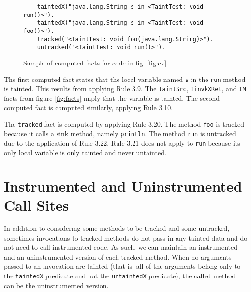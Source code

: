 \begin{figure}[H]
  \begin{lstlisting}
    taintedX("java.lang.String s in <TaintTest: void run()>").
    taintedX("java.lang.String s in <TaintTest: void foo()>").
    tracked("<TaintTest: void foo(java.lang.String)>").
    untracked("<TaintTest: void run()>").
  \end{lstlisting}
  \caption{Sample of computed facts for code in fig. \ref{fig:ex}}\label{fig:sol}
\end{figure}

The first computed fact states that the local variable named \texttt{s} in the \texttt{run} method is tainted. This results from applying Rule 3.9. The \texttt{taintSrc}, \texttt{IinvkXRet}, and \texttt{IM} facts from figure \ref{fig:facts} imply that the variable is tainted. The second computed fact is computed similarly, applying Rule 3.10.

The \texttt{tracked} fact is computed by applying Rule 3.20. The method \texttt{foo} is tracked because it calls a sink method, namely \texttt{println}. The method \texttt{run} is untracked due to the application of Rule 3.22. Rule 3.21 does not apply to \texttt{run} because its only local variable is only tainted and never untainted. 
    
\section{Instrumented and Uninstrumented Call Sites}
In addition to considering some methods to be tracked and some
untracked, sometimes invocations to tracked methods do not pass in any
tainted data and do not need to call instrumented code. As such, we
can maintain an instrumented and an uninstrumented version of each
tracked method. When no arguments passed to an invocation are tainted
(that is, all of the arguments belong only to the \texttt{taintedX}
predicate and not the \texttt{untaintedX} predicate), the called
method can be the uninstrumented version.

